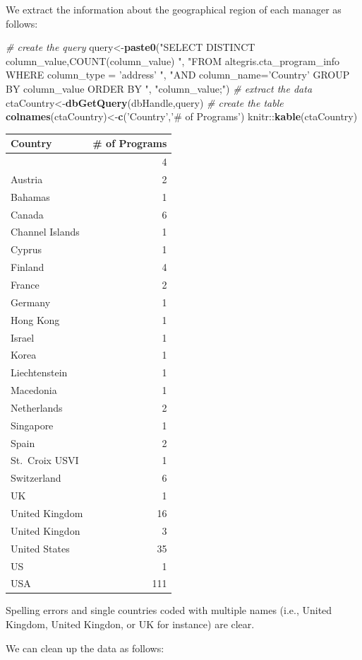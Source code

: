 \documentclass[]{article}
\newenvironment{Shaded}{\begin{snugshade}}{\end{snugshade}}
\newcommand{\KeywordTok}[1]{\textcolor[rgb]{0.13,0.29,0.53}{\textbf{{#1}}}}
\newcommand{\StringTok}[1]{\textcolor[rgb]{0.31,0.60,0.02}{{#1}}}
\newcommand{\CommentTok}[1]{\textcolor[rgb]{0.56,0.35,0.01}{\textit{{#1}}}}
\newcommand{\NormalTok}[1]{{#1}}
\begin{document}
We extract the information about the geographical region of each manager
as follows:

\begin{Shaded}
\begin{Highlighting}[]
\CommentTok{# create the query}
\NormalTok{query<-}\KeywordTok{paste0}\NormalTok{(}\StringTok{"SELECT DISTINCT column_value,COUNT(column_value) "}\NormalTok{,}
  \StringTok{"FROM altegris.cta_program_info WHERE column_type = 'address' "}\NormalTok{,}
  \StringTok{"AND column_name='Country' GROUP BY column_value  ORDER BY "}\NormalTok{,}
\StringTok{"column_value;"}\NormalTok{)}
\CommentTok{# extract the data}
\NormalTok{ctaCountry<-}\KeywordTok{dbGetQuery}\NormalTok{(dbHandle,query)}
\CommentTok{# create the table}
\KeywordTok{colnames}\NormalTok{(ctaCountry)<-}\KeywordTok{c}\NormalTok{(}\StringTok{'Country'}\NormalTok{,}\StringTok{'# of Programs'}\NormalTok{)}
\NormalTok{knitr::}\KeywordTok{kable}\NormalTok{(ctaCountry)}
\end{Highlighting}
\end{Shaded}

\begin{longtable}[c]{@{}lr@{}}
\toprule
Country & \# of Programs\tabularnewline
\midrule
\endhead
& 4\tabularnewline
Austria & 2\tabularnewline
Bahamas & 1\tabularnewline
Canada & 6\tabularnewline
Channel Islands & 1\tabularnewline
Cyprus & 1\tabularnewline
Finland & 4\tabularnewline
France & 2\tabularnewline
Germany & 1\tabularnewline
Hong Kong & 1\tabularnewline
Israel & 1\tabularnewline
Korea & 1\tabularnewline
Liechtenstein & 1\tabularnewline
Macedonia & 1\tabularnewline
Netherlands & 2\tabularnewline
Singapore & 1\tabularnewline
Spain & 2\tabularnewline
St.~Croix USVI & 1\tabularnewline
Switzerland & 6\tabularnewline
UK & 1\tabularnewline
United Kingdom & 16\tabularnewline
United Kingdon & 3\tabularnewline
United States & 35\tabularnewline
US & 1\tabularnewline
USA & 111\tabularnewline
\bottomrule
\end{longtable}

Spelling errors and single countries coded with multiple names (i.e.,
United Kingdom, United Kingdon, or UK for instance) are clear.

We can clean up the data as follows:
\end{document}
